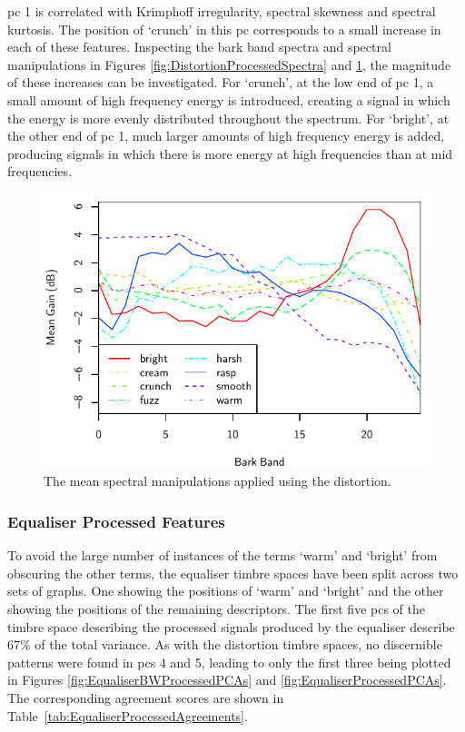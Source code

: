 			\acrshort{pc} 1 is correlated with Krimphoff irregularity, spectral skewness and spectral kurtosis.
			The position of `crunch' in this \acrshort{pc} corresponds to a small increase in each of these
			features.  Inspecting the bark band spectra and spectral manipulations in Figures
			\ref{fig:DistortionProcessedSpectra} and \ref{fig:DistortionDifferenceSpectra}, the magnitude of
			these increases can be investigated. For `crunch', at the low end of \acrshort{pc} 1, a small
			amount of high frequency energy is introduced, creating a signal in which the energy is more evenly
			distributed throughout the spectrum. For `bright', at the other end of \acrshort{pc} 1, much larger
			amounts of high frequency energy is added, producing signals in which there is more energy at high
			frequencies than at mid frequencies.

			\begin{figure}[h!]
				\centering
				\includegraphics{chapter4/Images/DistortionDifferenceSpectra.pdf}
				\caption{The mean spectral manipulations applied using the distortion.}
				\label{fig:DistortionDifferenceSpectra}
			\end{figure}

		\subsubsection*{Equaliser Processed Features}
			To avoid the large number of instances of the terms `warm' and `bright' from obscuring the other
			terms, the equaliser timbre spaces have been split across two sets of graphs. One showing the
			positions of `warm' and `bright' and the other showing the positions of the remaining descriptors.
			The first five \acrshort{pc}s of the timbre space describing the processed signals produced by the
			equaliser describe 67\% of the total variance. As with the distortion timbre spaces, no discernible
			patterns were found in \acrshort{pc}s 4 and 5, leading to only the first three being plotted in
			Figures \ref{fig:EqualiserBWProcessedPCAs} and \ref{fig:EqualiserProcessedPCAs}. The corresponding
			agreement scores are shown in Table~\ref{tab:EqualiserProcessedAgreements}.

